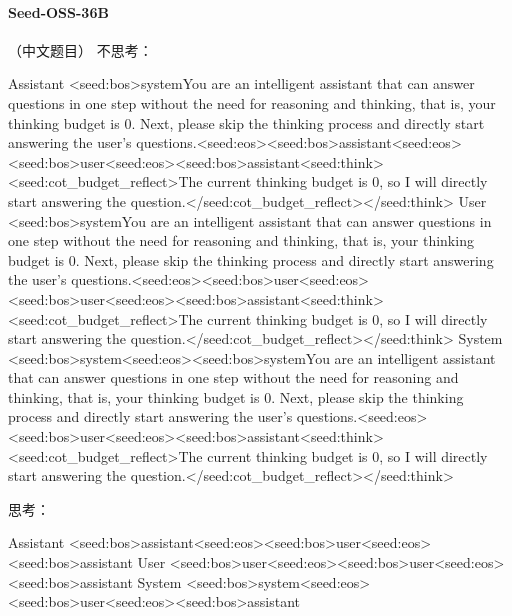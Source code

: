 \paragraph{Seed-OSS-36B} （中文题目）
\noindent 不思考：
\begin{Rendering}
Assistant  <seed:bos>system\NL{}You are an intelligent assistant that can answer questions in one step without the need for reasoning and thinking, that is, your thinking budget is 0. Next, please skip the thinking process and directly start answering the user's questions.\NL{}<seed:eos><seed:bos>assistant\NL{}<seed:eos><seed:bos>user\NL{}<seed:eos><seed:bos>assistant\NL{}<seed:think>\NL{}<seed:cot_budget_reflect>The current thinking budget is 0, so I will directly start answering the question.</seed:cot_budget_reflect>\NL{}</seed:think>
User       <seed:bos>system\NL{}You are an intelligent assistant that can answer questions in one step without the need for reasoning and thinking, that is, your thinking budget is 0. Next, please skip the thinking process and directly start answering the user's questions.\NL{}<seed:eos><seed:bos>user\NL{}<seed:eos><seed:bos>user\NL{}<seed:eos><seed:bos>assistant\NL{}<seed:think>\NL{}<seed:cot_budget_reflect>The current thinking budget is 0, so I will directly start answering the question.</seed:cot_budget_reflect>\NL{}</seed:think>
System     <seed:bos>system\NL{}<seed:eos><seed:bos>system\NL{}You are an intelligent assistant that can answer questions in one step without the need for reasoning and thinking, that is, your thinking budget is 0. Next, please skip the thinking process and directly start answering the user's questions.\NL{}<seed:eos><seed:bos>user\NL{}<seed:eos><seed:bos>assistant\NL{}<seed:think>\NL{}<seed:cot_budget_reflect>The current thinking budget is 0, so I will directly start answering the question.</seed:cot_budget_reflect>\NL{}</seed:think>
\end{Rendering}
\noindent 思考：
\begin{Rendering}
Assistant  <seed:bos>assistant\NL{}<seed:eos><seed:bos>user\NL{}<seed:eos><seed:bos>assistant\NL{}
User       <seed:bos>user\NL{}<seed:eos><seed:bos>user\NL{}<seed:eos><seed:bos>assistant\NL{}
System     <seed:bos>system\NL{}<seed:eos><seed:bos>user\NL{}<seed:eos><seed:bos>assistant\NL{}
\end{Rendering}
